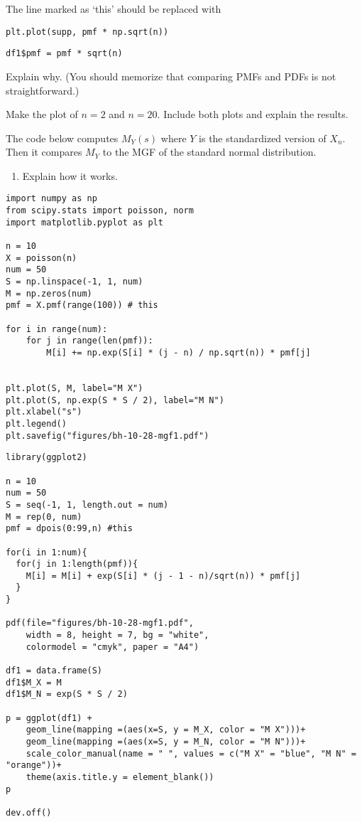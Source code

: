 \begin{exercise}
The line  marked as `this' should be replaced with
\begin{verbatim}
plt.plot(supp, pmf * np.sqrt(n))
\end{verbatim}

\begin{verbatim}
df1$pmf = pmf * sqrt(n)
\end{verbatim}
Explain why.  (You should memorize  that comparing PMFs and PDFs is not straightforward.)
\end{exercise}


\begin{exercise}
Make the plot of $n=2$ and $n=20$. Include both plots and explain the results.
\end{exercise}

\begin{exercise}
The code below computes $M_{Y}(s)$ where $Y$ is the standardized version of $X_{n}$. Then it compares $M_Y$ to the MGF of the standard normal distribution.
\begin{enumerate}
\item Explain how it works.
\end{enumerate}
\end{exercise}

\begin{verbatim}
import numpy as np
from scipy.stats import poisson, norm
import matplotlib.pyplot as plt

n = 10
X = poisson(n)
num = 50
S = np.linspace(-1, 1, num)
M = np.zeros(num)
pmf = X.pmf(range(100)) # this

for i in range(num):
    for j in range(len(pmf)):
        M[i] += np.exp(S[i] * (j - n) / np.sqrt(n)) * pmf[j]


plt.plot(S, M, label="M X")
plt.plot(S, np.exp(S * S / 2), label="M N")
plt.xlabel("s")
plt.legend()
plt.savefig("figures/bh-10-28-mgf1.pdf")
\end{verbatim}

\begin{verbatim}
library(ggplot2)

n = 10
num = 50
S = seq(-1, 1, length.out = num)
M = rep(0, num)
pmf = dpois(0:99,n) #this

for(i in 1:num){
  for(j in 1:length(pmf)){
    M[i] = M[i] + exp(S[i] * (j - 1 - n)/sqrt(n)) * pmf[j]
  }
}

pdf(file="figures/bh-10-28-mgf1.pdf",
    width = 8, height = 7, bg = "white",
    colormodel = "cmyk", paper = "A4")

df1 = data.frame(S)
df1$M_X = M
df1$M_N = exp(S * S / 2)

p = ggplot(df1) +
    geom_line(mapping =(aes(x=S, y = M_X, color = "M X")))+
    geom_line(mapping =(aes(x=S, y = M_N, color = "M N")))+
    scale_color_manual(name = " ", values = c("M X" = "blue", "M N" = "orange"))+
    theme(axis.title.y = element_blank())
p

dev.off()
\end{verbatim}

